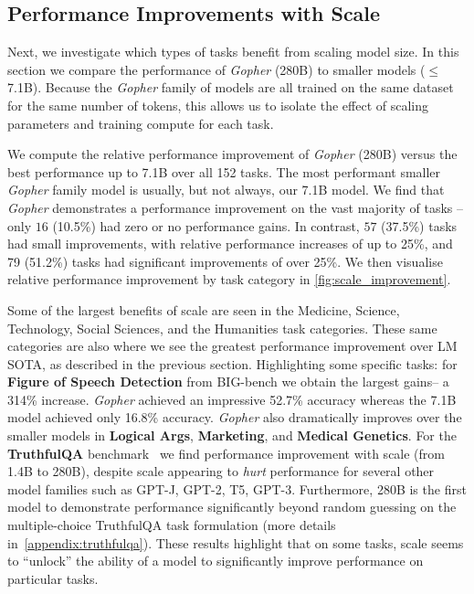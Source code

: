 \subsection{Performance Improvements with Scale} Next, we investigate which types of tasks benefit from scaling model size. In this section we compare the performance of \textit{Gopher} (280B) to smaller models ($\leq$ 7.1B). Because the \textit{Gopher} family of models are all trained on the same dataset for the same number of tokens, this allows us to isolate the effect of scaling parameters and training compute for each task.   

We compute the relative performance improvement of \textit{Gopher} (280B) versus the best performance up to 7.1B over all 152 tasks. The most performant smaller \textit{Gopher} family model is usually, but not always, our 7.1B model. We find that \textit{Gopher} demonstrates a performance improvement on the vast majority of tasks -- only $16$ (10.5\%) had zero or no performance gains. In contrast, $57$ (37.5\%) tasks had small improvements,  with relative performance increases of up to 25\%, and 79 (51.2\%) tasks had significant improvements of over 25\%. We then visualise relative performance improvement by task category in \autoref{fig:scale_improvement}.

Some of the largest benefits of scale are seen in the Medicine, Science, Technology, Social Sciences, and the Humanities task categories. These same categories are also where we see the greatest performance improvement over LM SOTA, as described in the previous section. Highlighting some specific tasks: for \textbf{Figure of Speech Detection} from BIG-bench we obtain the largest gains-- a 314\% increase.
\textit{Gopher} achieved an impressive 52.7\% accuracy whereas the 7.1B model achieved only 16.8\% accuracy.
\textit{Gopher} also dramatically improves over the smaller models in \textbf{Logical Args}, \textbf{Marketing}, and \textbf{Medical Genetics}. For the \textbf{TruthfulQA} benchmark~\citep{truthfulqa} we find performance improvement with scale (from 1.4B to 280B), despite scale appearing to \textit{hurt} performance for several other model families such as GPT-J, GPT-2, T5, GPT-3. Furthermore, 280B is the first model to demonstrate performance significantly beyond random guessing on the multiple-choice TruthfulQA task formulation (more details in~\autoref{appendix:truthfulqa}).
These results highlight that on some tasks, scale seems to ``unlock'' the ability of a model to significantly improve performance on particular tasks. 

